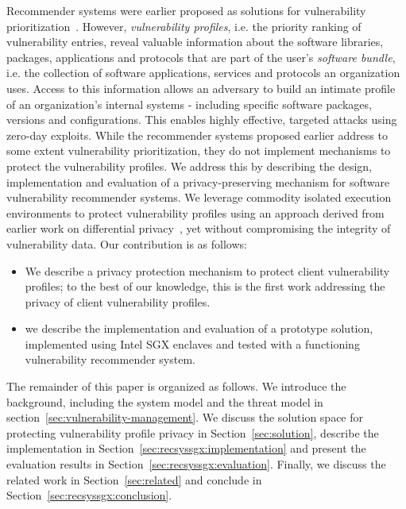 {Recommender systems \cite{aggarwal:2016} were earlier proposed as solutions for vulnerability prioritization~\cite{bozorgi:2009,farris:2018,cobleigh:2018}.
However, \textit{vulnerability profiles}, i.e. the priority ranking of vulnerability entries, reveal valuable information about the software libraries, packages, applications and protocols that are part of the user's \textit{software bundle}, i.e. the collection of software applications, services and protocols an organization uses.
Access to this information allows an adversary to build an intimate profile of an organization's internal systems - including specific software packages, versions and configurations.
This enables highly effective, targeted attacks using zero-day exploits.
While the recommender systems proposed earlier address to some extent vulnerability prioritization, they do not implement mechanisms to protect the vulnerability profiles.
We address this by describing the design, implementation and evaluation of a privacy-preserving mechanism for software vulnerability recommender systems.
We leverage commodity isolated execution environments to protect vulnerability profiles using an approach derived from earlier work on differential privacy~\cite{dwork:2006}, yet without compromising the integrity of vulnerability data.
Our contribution is as follows:
\begin{itemize}
    \item We describe a privacy protection mechanism to protect client vulnerability profiles;
    to the best of our knowledge, this is the first work addressing the privacy of client vulnerability profiles.
    \item we describe the implementation and evaluation of a prototype solution, implemented using Intel SGX enclaves and tested with a functioning vulnerability recommender system.
\end{itemize}

The remainder of this paper is organized as follows.
We introduce the background, including the system model and the threat model in section~\ref{sec:vulnerability-management}.
We discuss the solution space for protecting vulnerability profile privacy in Section~\ref{sec:solution},
describe the implementation in Section~\ref{sec:recsyssgx:implementation} and present the evaluation results in Section~\ref{sec:recsyssgx:evaluation}.
Finally, we discuss the related work in Section~\ref{sec:related} and conclude in Section~\ref{sec:recsyssgx:conclusion}.

}
